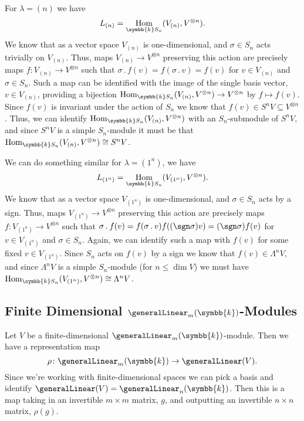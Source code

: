 \documentclass[fleqn]{NotesClass}
\renewcommand{\field}{\symbb{k}}
\DeclareMathOperator{\Hom}{Hom}
\newcommand{\action}{\mathbin{.}}
\newcommand{\isomorphic}{\cong}
\begin{document}
    \begin{exm}{}{}
        For \(\lambda = (n)\) we have
        \begin{equation}
            L_{(n)} = \Hom_{\field S_n}(V_{(n)}, V^{\otimes n}).
        \end{equation}
        We know that as a vector space \(V_{(n)}\) is one-dimensional, and \(\sigma \in S_n\) acts trivially on \(V_{(n)}\).
        Thus, maps \(V_{(n)} \to V^{\otimes n}\) preserving this action are precisely maps \(f \colon V_{(n)} \to V^{\otimes n}\) such that \(\sigma \action f(v) = f(\sigma \action v) = f(v)\) for \(v \in V_{(n)}\) and \(\sigma \in S_n\).
        Such a map can be identified with the image of the single basis vector, \(v \in V_{(n)}\), providing a bijection \(\Hom_{\field S_n}(V_{(n)}, V^{\otimes n}) \to V^{\otimes n}\) by \(f \mapsto f(v)\).
        Since \(f(v)\) is invariant under the action of \(S_n\) we know that \(f(v) \in S^nV \subseteq V^{\otimes n}\).
        Thus, we can identify \(\Hom_{\field S_n}(V_{(n)}, V^{\otimes n})\) with an \(S_n\)-submodule of \(S^nV\), and since \(S^nV\) is a simple \(S_n\)-module it must be that \(\Hom_{\field S_n}(V_{(n)}, V^{\otimes n}) \isomorphic S^nV\).
        
        We can do something similar for \(\lambda = (1^n)\), we have
        \begin{equation}
            L_{(1^n)} = \Hom_{\field S_n}(V_{(1^n)}, V^{\otimes n}).
        \end{equation}
        We know that as a vector space \(V_{(1^n)}\) is one-dimensional, and \(\sigma \in S_n\) acts by a sign.
        Thus, maps \(V_{(1^n)} \to V^{\otimes n}\) preserving this action are precisely maps \(f \colon V_{(1^n)} \to V^{\otimes n}\) such that \(\sigma \action f(v) = f(\sigma \action v) f((\sgn \sigma) v) = (\sgn \sigma) f(v)\) for \(v \in V_{(1^n)}\) and \(\sigma \in S_n\).
        Again, we can identify such a map with \(f(v)\) for some fixed \(v \in V_{(1^n)}\).
        Since \(S_n\) acts on \(f(v)\) by a sign we know that \(f(v) \in \Lambda^nV\), and since \(\Lambda^nV\) is a simple \(S_n\)-module (for \(n \le \dim V\)) we must have \(\Hom_{\field S_n}(V_{(1^n)}, V^{\otimes n}) \isomorphic \Lambda^nV\).
    \end{exm}
    
    \subsection{Finite Dimensional \texorpdfstring{\(\generalLinear_m(\field)\)}{GLm(k)}-Modules}
    Let \(V\) be a finite-dimensional \(\generalLinear_m(\field)\)-module.
    Then we have a representation map
    \begin{equation}
        \rho \colon \generalLinear_m(\field) \to \generalLinear(V).
    \end{equation}
    Since we're working with finite-dimensional spaces we can pick a basis and identify \(\generalLinear(V) = \generalLinear_n(\field)\).
    Then this is a map taking in an invertible \(m \times m\) matrix, \(g\), and outputting an invertible \(n \times n\) matrix, \(\rho(g)\).
    
\end{document}
